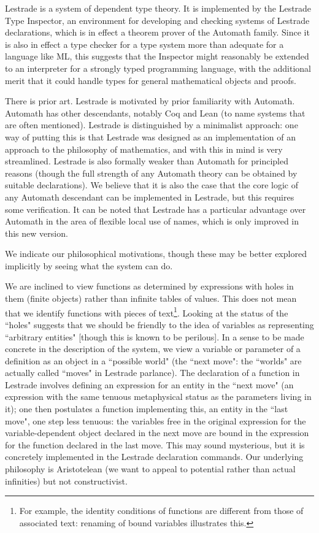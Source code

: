 \documentclass[12pt]{article}
\begin{document}
Lestrade is a system of dependent type theory.  It is implemented by the Lestrade Type Inspector, an environment for developing and checking systems of Lestrade declarations, which is in effect a theorem prover of the Automath family.  Since it is also in effect a type checker for a type system more than adequate for a language like ML, this suggests that the Inspector might reasonably be extended to an interpreter for a strongly typed programming language, with the additional merit that it could handle types for general mathematical objects and proofs.

There is prior art.  Lestrade is motivated by prior familiarity with Automath.  Automath has other descendants, notably Coq and Lean (to name systems that are often mentioned).  Lestrade is distinguished by a minimalist approach:  one way of putting this is that Lestrade was designed as an implementation of an approach to the philosophy of mathematics, and with this in mind is very streamlined.  Lestrade is also formally weaker than Automath for principled reasons (though the full strength of any Automath theory can be obtained by suitable declarations).  We believe that it is also the case that the core logic of any Automath descendant can be implemented in Lestrade, but this requires some verification.  It can be noted that Lestrade has a particular advantage over Automath in the area of flexible local use of names, which is only improved in this new version.

We indicate our philosophical motivations, though these may be better explored implicitly by seeing what the system can do.

We are inclined to view functions as determined by expressions with holes in them (finite objects) rather than infinite tables of values.  This does not mean that we identify
functions with pieces of text\footnote{For example, the identity conditions of functions are different from those of associated text:  renaming of bound variables illustrates this.}.  Looking at the status of the ``holes"  suggests that we should be friendly to the idea of variables as representing ``arbitrary entities" [though this is known to be perilous].  In a sense to be made concrete in the description of the system, we view a variable or parameter of a definition as an object in a ``possible world" (the ``next move":  the ``worlds" are actually called ``moves" in Lestrade parlance).  The declaration of a function in Lestrade involves defining an expression for an entity in the ``next move" (an expression with the same tenuous metaphysical status
as the parameters living in it); one then postulates a function implementing this, an entity in the ``last move", one step less tenuous:  the variables free in the original expression for the variable-dependent object declared  in the next move are bound in the expression for the function declared in the last move.  This may sound mysterious, but it is concretely implemented in the Lestrade declaration commands.  Our underlying philosophy is Aristotelean (we want to appeal to potential rather than actual infinities) but not constructivist.
\end{document}
